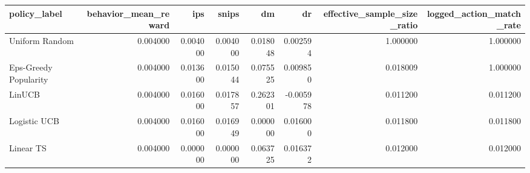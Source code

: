 \begin{tabular}{lrrrrrrr}
\toprule
policy\_label & behavior\_mean\_reward & ips & snips & dm & dr & effective\_sample\_size\_ratio & logged\_action\_match\_rate \\
\midrule
Uniform Random & 0.004000 & 0.004000 & 0.004000 & 0.018048 & 0.002594 & 1.000000 & 1.000000 \\
Eps-Greedy Popularity & 0.004000 & 0.013600 & 0.015044 & 0.075525 & 0.009850 & 0.018009 & 1.000000 \\
LinUCB & 0.004000 & 0.016000 & 0.017857 & 0.262301 & -0.005978 & 0.011200 & 0.011200 \\
Logistic UCB & 0.004000 & 0.016000 & 0.016949 & 0.000000 & 0.016000 & 0.011800 & 0.011800 \\
Linear TS & 0.004000 & 0.000000 & 0.000000 & 0.063725 & 0.016372 & 0.012000 & 0.012000 \\
\bottomrule
\end{tabular}
